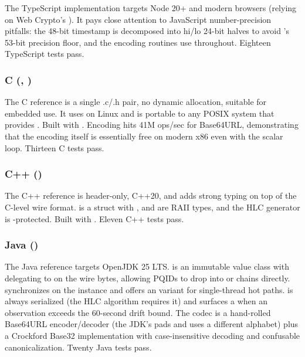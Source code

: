 The TypeScript implementation targets Node 20+ and modern browsers (relying on Web Crypto's ). It pays close attention to JavaScript number-precision pitfalls: the 48-bit timestamp is decomposed into hi/lo 24-bit halves to avoid 's 53-bit precision floor, and the encoding routines use  throughout. Eighteen TypeScript tests pass.

\subsubsection{C (, )}

The C reference is a single .c/.h pair, no dynamic allocation, suitable for embedded use. It uses  on Linux and is portable to any POSIX system that provides . Built with . Encoding hits 41M ops/sec for Base64URL, demonstrating that the encoding itself is essentially free on modern x86 even with the scalar loop. Thirteen C tests pass.

\subsubsection{C++ ()}

The C++ reference is header-only, C++20, and adds strong typing on top of the C-level wire format.  is a struct with ,  and  are RAII types, and the HLC generator is -protected. Built with . Eleven C++ tests pass.

\subsubsection{Java ()}

The Java reference targets OpenJDK 25 LTS.  is an immutable value class with  delegating to  on the wire bytes, allowing PQIDs to drop into  or  chains directly.  synchronizes on the instance and offers an  variant for single-thread hot paths.  is always serialized (the HLC algorithm requires it) and surfaces a  when an observation exceeds the 60-second drift bound. The codec is a hand-rolled Base64URL encoder/decoder (the JDK's  pads and uses a different alphabet) plus a Crockford Base32 implementation with case-insensitive decoding and confusable canonicalization. Twenty Java tests pass.

